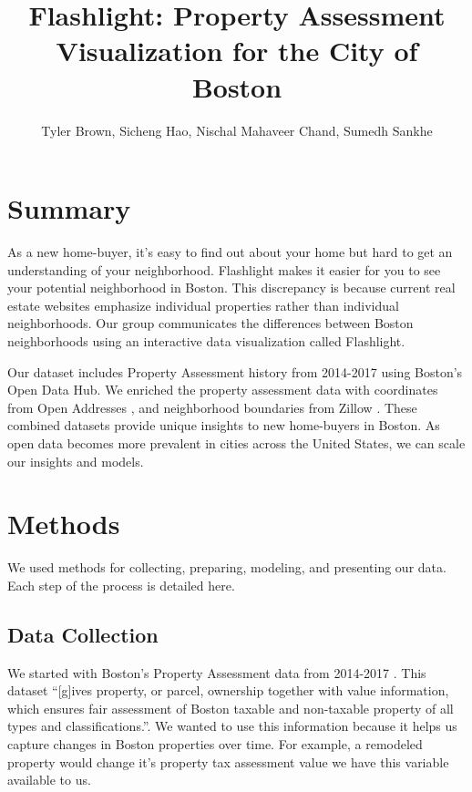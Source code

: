 \documentclass[12pt]{article}
\title{\textbf{Flashlight}: Property Assessment Visualization for the City of Boston}
\author{Tyler Brown, Sicheng Hao, Nischal Mahaveer Chand, Sumedh Sankhe}
\date{ }
\begin{document}
\maketitle

\section*{Summary}

As a new home-buyer, it's easy to find out about your home
but hard to get an understanding of your neighborhood. Flashlight
makes it easier for you to see your potential neighborhood in Boston.
This discrepancy is because current real estate websites emphasize
individual properties rather than individual neighborhoods. Our group
communicates the differences between Boston neighborhoods using an
interactive data visualization called Flashlight.

Our dataset includes Property Assessment history from 2014-2017
\cite{Property49:online} using Boston's Open Data Hub. We enriched the 
property assessment data with coordinates from Open Addresses
\cite{OpenAddr24:online}, and neighborhood boundaries from Zillow
\cite{ZillowNe81:online}. These combined datasets provide unique
insights to new home-buyers in Boston. As open data becomes more
prevalent in cities across the United States, we can scale our insights
and models.

\section*{Methods}

We used methods for collecting, preparing, modeling, and presenting
our data. Each step of the process is detailed here.

\subsection{Data Collection}

We started with Boston's Property Assessment data from 2014-2017
\cite{Property49:online}. This dataset ``[g]ives property, or parcel,
ownership together with value information, which ensures fair assessment
of Boston taxable and non-taxable property of all types and
classifications.''\cite{Property49:online}. We wanted to use this
information because it helps us capture changes in Boston properties
over time. For example, a remodeled property would change it's property
tax assessment value we have this variable available to us.
\end{document}
